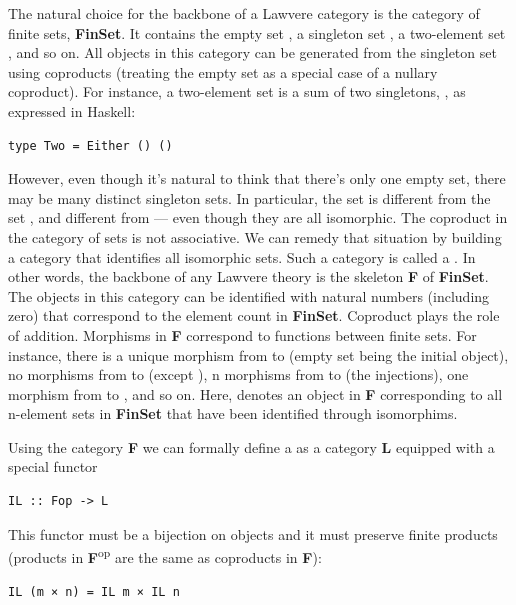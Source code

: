 The natural choice for the backbone of a Lawvere category is the
category of finite sets, \textbf{FinSet}. It contains the empty set
, a singleton set , a two-element set ,
and so on. All objects in this category can be generated from the
singleton set using coproducts (treating the empty set as a special case
of a nullary coproduct). For instance, a two-element set is a sum of two
singletons, , as expressed in Haskell:

\begin{verbatim}
type Two = Either () ()
\end{verbatim}

However, even though it's natural to think that there's only one empty
set, there may be many distinct singleton sets. In particular, the set
 is different from the set , and
different from  --- even though they are all isomorphic. The
coproduct in the category of sets is not associative. We can remedy that
situation by building a category that identifies all isomorphic sets.
Such a category is called a . In other words, the
backbone of any Lawvere theory is the skeleton \textbf{F} of
\textbf{FinSet}. The objects in this category can be identified with
natural numbers (including zero) that correspond to the element count in
\textbf{FinSet}. Coproduct plays the role of addition. Morphisms in
\textbf{F} correspond to functions between finite sets. For instance,
there is a unique morphism from  to  (empty set
being the initial object), no morphisms from  to 
(except ), n morphisms from  to
 (the injections), one morphism from  to ,
and so on. Here,  denotes an object in \textbf{F}
corresponding to all n-element sets in \textbf{FinSet} that have been
identified through isomorphims.

Using the category \textbf{F} we can formally define a  as a category \textbf{L} equipped with a special functor

\begin{verbatim}
IL :: Fop -> L
\end{verbatim}

This functor must be a bijection on objects and it must preserve finite
products (products in \textbf{F}\textsuperscript{op} are the same as
coproducts in \textbf{F}):

\begin{verbatim}
IL (m × n) = IL m × IL n
\end{verbatim}


